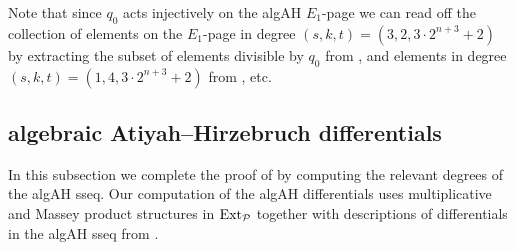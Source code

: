 \begin{rmk} \label{rmk:q0 remove}
  Note that since $q_0$ acts injectively on the algAH $E_1$-page we can read off
  the collection of elements on the $E_1$-page in degree
  $(s,k,t) = (3,2,3 \cdot 2^{n+3} + 2)$
  by extracting the subset of elements divisible by $q_0$ from , and elements in degree $(s,k,t) = (1,4,3 \cdot 2^{n+3} + 2)$ from , etc.
\end{rmk}


\subsection{algebraic Atiyah--Hirzebruch differentials}\hfill

In this subsection we complete the proof of  by computing the 
relevant degrees of the algAH sseq.
Our computation of the algAH differentials uses multiplicative and Massey product structures in $\operatorname{\mathrm{Ext}}_{\mathcal{P}}$ together with descriptions of differentials in the algAH sseq from .






